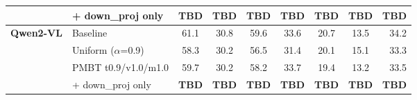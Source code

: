 \begin{table}[t]
\begin{tabular}{llcccccc r}
                 & \quad+ down\_proj only      & \textbf{TBD} & \textbf{TBD}  & \textbf{TBD} & \textbf{TBD} & \textbf{TBD} & \textbf{TBD} & \textbf{TBD}  \\
\midrule
\multirow{4}{*}{\textbf{Qwen2-VL}}
                 & Baseline                    & 61.1        & 30.8          & 59.6       & 33.6       & 20.7       & 13.5    & 34.2  \\
                 & Uniform ($\alpha$=0.9)      & 58.3        & 30.2          & 56.5       & 31.4       & 20.1       & 15.1    & 33.3  \\
                 & PMBT t0.9/v1.0/m1.0         & 59.7        & 30.2          & 58.2       & 33.7       & 19.4       & 13.2    & 33.5  \\
                 & \quad+ down\_proj only      & \textbf{TBD} & \textbf{TBD}  & \textbf{TBD} & \textbf{TBD} & \textbf{TBD} & \textbf{TBD} & \textbf{TBD}  \\
\bottomrule
\end{tabular}
\end{table}


%

